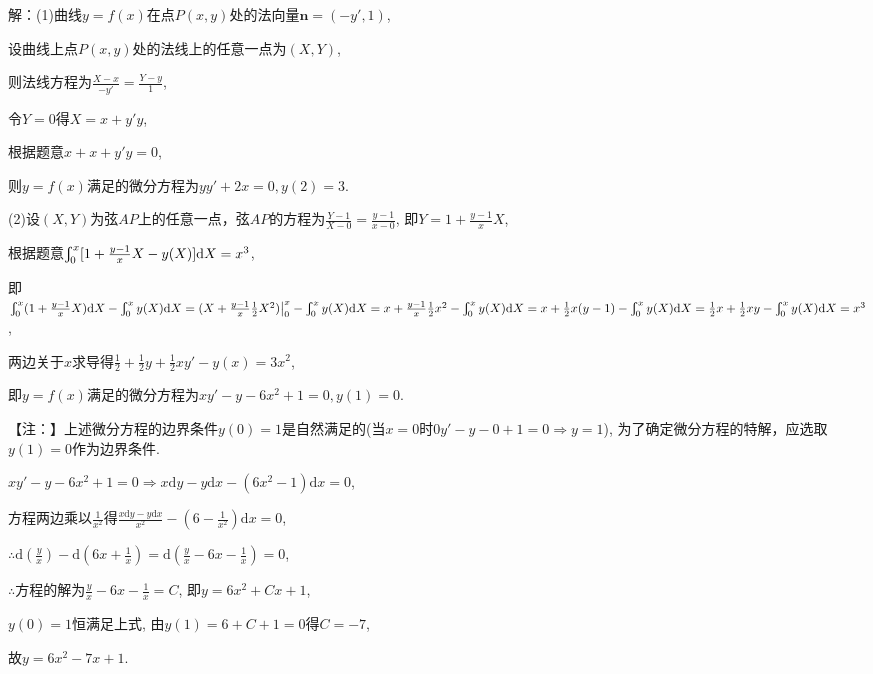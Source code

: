 \documentclass[12pt,UTF8,fleqn]{ctexart}
\newcommand{\Int}[4]{\varint\nolimits_{#1}^{#2}#3\mathrm d#4}
\newcommand{\md}[1]{\mathrm d#1}
\begin{document}
\begin{enumerate}
解：(1)曲线$y=f(x)$在点$P(x,y)$处的法向量$\bm n=(-y',1)$,

设曲线上点$P(x,y)$处的法线上的任意一点为$(X,Y)$,

则法线方程为$\frac{X-x}{-y'}=\frac{Y-y}1$,

令$Y=0$得$X=x+y'y$,

根据题意$x+x+y'y=0$,

则$y=f(x)$满足的微分方程为$yy'+2x=0,y(2)=3$.

(2)设$(X,Y)$为弦$AP$上的任意一点，弦$AP$的方程为$\frac{Y-1}{X-0}=\frac{y-1}{x-0}$, 即$Y=1+\frac{y-1}xX$,

根据题意$\Int0x{[1+\frac{y-1}xX-y(X)]}X=x^3$,

即$\Int0x{(1+\frac{y-1}xX)}X-\Int0x{y(X)}X=(X+\frac{y-1}x\frac12X^2)\big|_0^x-\Int0x{y(X)}X\\
=x+\frac{y-1}x\frac12x^2-\Int0x{y(X)}X=x+\frac12x(y-1)-\Int0x{y(X)}X=\frac12x+\frac12xy-\Int0x{y(X)}X=x^3$,

两边关于$x$求导得$\frac12+\frac12y+\frac12xy'-y(x)=3x^2$,

即$y=f(x)$满足的微分方程为$xy'-y-6x^2+1=0, y(1)=0$.

【注：】上述微分方程的边界条件$y(0)=1$是自然满足的(当$x=0$时$0y'-y-0+1=0\Rightarrow y=1$), 为了确定微分方程的特解，应选取$y(1)=0$作为边界条件.

$xy'-y-6x^2+1=0\Rightarrow x\md y-y\md x-(6x^2-1)\md x=0$,

方程两边乘以$\frac1{x^2}$得$\frac{x\md y-y\md x}{x^2}-(6-\frac1{x^2})\md x=0$,

$\therefore\md(\frac yx)-\md(6x+\frac1x)=\md(\frac yx-6x-\frac1x)=0$,

$\therefore$方程的解为$\frac yx-6x-\frac1x=C$, 即$y=6x^2+Cx+1$,

$y(0)=1$恒满足上式, 由$y(1)=6+C+1=0$得$C=-7$,

故$y=6x^2-7x+1$.
\end{enumerate}
\end{document}
